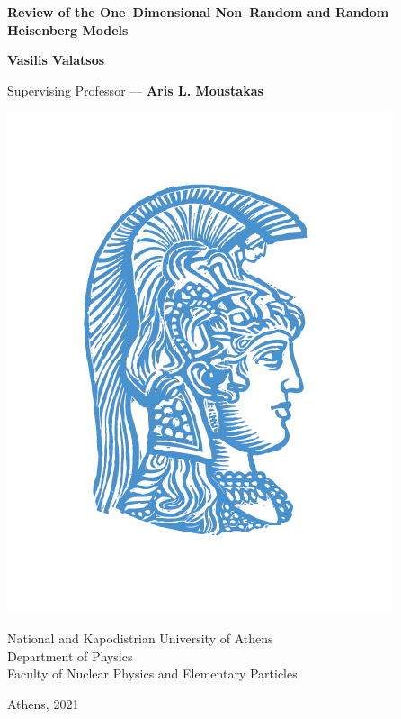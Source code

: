 \documentclass[../main.tex]{subfiles}
\begin{document}
\begin{titlepage}
\begin{center}
        \vspace{2cm}

        \Huge
        \textbf{Review of the One--Dimensional Non--Random and Random Heisenberg Models}
            
        \vspace{2cm}
        \huge
        \textbf{Vasilis Valatsos}
        
        \Large
        \vspace{2cm}
        Supervising Professor --- \textbf{Aris L. Moustakas}

        \vspace{1cm}
        \includegraphics[scale=1.7]{university.jpg}
        

        National and Kapodistrian University of Athens\\
        Department of Physics\\
        Faculty of Nuclear Physics and Elementary Particles
        
        \vfill
        Athens, 2021
\end{center}
\end{titlepage}
\end{document}
